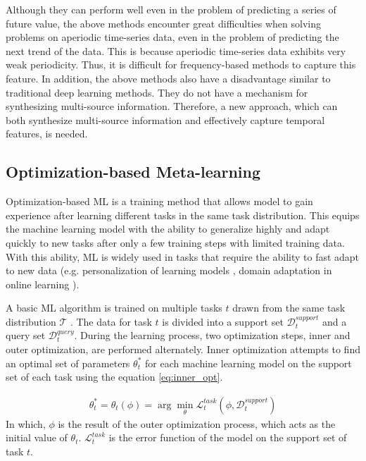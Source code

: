 \documentclass[a4paper,fleqn]{cas-sc}
\begin{document}
Although they can perform well even in the problem of predicting a series of future value, the above methods encounter great difficulties when solving problems on aperiodic time-series data, even in the problem of predicting the next trend of the data. This is because aperiodic time-series data exhibits very weak periodicity. Thus, it is difficult for frequency-based methods to capture this feature. In addition, the above methods also have a disadvantage similar to traditional deep learning methods. They do not have a mechanism for synthesizing multi-source information. Therefore, a new approach, which can both synthesize multi-source information and effectively capture temporal features, is needed.

\subsection{Optimization-based Meta-learning}
\label{subsec:ml}

Optimization-based ML is a training method that allows model to gain experience after learning different tasks in the same task distribution. This equips the machine learning model with the ability to generalize highly and adapt quickly to new tasks after only a few training steps with limited training data. With this ability, ML is widely used in tasks that require the ability to fast adapt to new data (e.g. personalization of learning models \cite{chen2018federated, fallah2020personalized,nguyen2022meta}, domain adaptation in online learning \cite{hu2023meta, son2024meta}).

\vspace{1mm}

A basic ML algorithm is trained on multiple tasks $t$ drawn from the same task distribution $\mathcal{T}$ \cite{hospedales2021meta}. The data for task $t$ is divided into a support set $\mathcal{D}_t^{support}$ and a query set $\mathcal{D}_t^{query}$. During the learning process, two optimization steps, inner and outer optimization, are performed alternately. Inner optimization attempts to find an optimal set of parameters $\theta_t^*$ for each machine learning model on the support set of each task using the equation \ref{eq:inner_opt}.

\begin{align}
    \theta_t^* = \theta_t(\phi) = \arg\min_{\theta}{\mathcal{L}^{task}_t\left( \phi, \mathcal{D}_t^{support} \right)}
    \label{eq:inner_opt}
\end{align} In which, $\phi$ is the result of the outer optimization process, which acts as the initial value of $\theta_t$. $\mathcal{L}^{task}_t$ is the error function of the model on the support set of task $t$.
\end{document}
